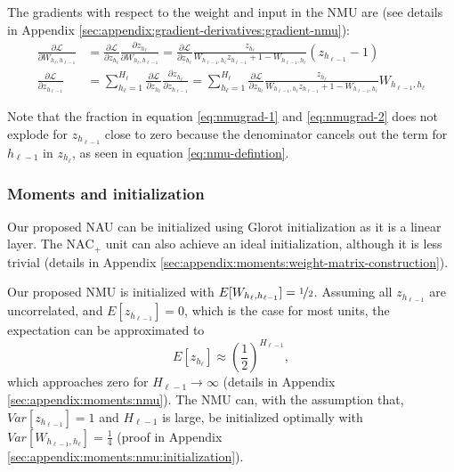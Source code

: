 The gradients with respect to the weight and input in the NMU are (see details in Appendix \ref{sec:appendix:gradient-derivatives:gradient-nmu}):
\begin{align}
\frac{\partial \mathcal{L}}{\partial W_{h_{\ell}, h_{\ell - 1}}} &= \frac{\partial \mathcal{L}}{\partial z_{h_\ell}} \frac{\partial z_{h_\ell}}{\partial W_{h_{\ell}, h_{\ell - 1}}} = \frac{\partial \mathcal{L}}{\partial z_{h_\ell}} \frac{z_{h_\ell}}{W_{h_{\ell-1},h_\ell} z_{h_{\ell-1}} + 1 - W_{h_{\ell-1},h_\ell}} \left(z_{h_{\ell-1}} - 1\right) \label{eq:nmugrad-1} \\
\frac{\partial \mathcal{L}}{\partial z_{h_{\ell-1}}} &= \sum_{h_\ell = 1}^{H_\ell} \frac{\partial \mathcal{L}}{\partial z_{h_\ell}} \frac{\partial z_{h_\ell}}{\partial z_{h_{\ell-1}}} = \sum_{h_\ell = 1}^{H_\ell} \frac{\partial \mathcal{L}}{\partial z_{h_\ell}} \frac{z_{h_\ell}}{W_{h_{\ell-1},h_\ell} z_{h_{\ell-1}} + 1 - W_{h_{\ell-1},h_\ell}} W_{h_{\ell-1},h_\ell} \label{eq:nmugrad-2}
\end{align}

Note that the fraction in equation \ref{eq:nmugrad-1} and \ref{eq:nmugrad-2} does not explode for $z_{h_{\ell-1}}$ close to zero because the denominator cancels out the term for $h_{\ell-1}$ in $z_{h_\ell}$, as seen in equation \ref{eq:nmu-defintion}.

\subsubsection{Moments and initialization}
Our proposed NAU can be initialized using Glorot initialization as it is a linear layer. The $\mathrm{NAC}_{+}$ unit can also achieve an ideal initialization, although it is less trivial (details in Appendix \ref{sec:appendix:moments:weight-matrix-construction}).

Our proposed NMU is initialized with $E[W_{h_{\ell}, h_{\ell - 1}}] = \nicefrac{1}{2}$. Assuming all $z_{h_{\ell-1}}$ are uncorrelated, and $E[z_{h_{\ell-1}}] = 0$, which is the case for most units, the expectation can be approximated to
\begin{equation}
E[z_{h_\ell}] \approx \left(\frac{1}{2}\right)^{H_{\ell-1}},
\end{equation}
which approaches zero for $H_{\ell-1} \rightarrow \infty$ (details in Appendix \ref{sec:appendix:moments:nmu}). The NMU can, with the assumption that, $Var[z_{h_{\ell-1}}] = 1$ and $H_{\ell-1}$ is large, be initialized optimally with $Var[W_{h_{\ell-1},h_\ell}] = \frac{1}{4}$ (proof in Appendix \ref{sec:appendix:moments:nmu:initialization}). 